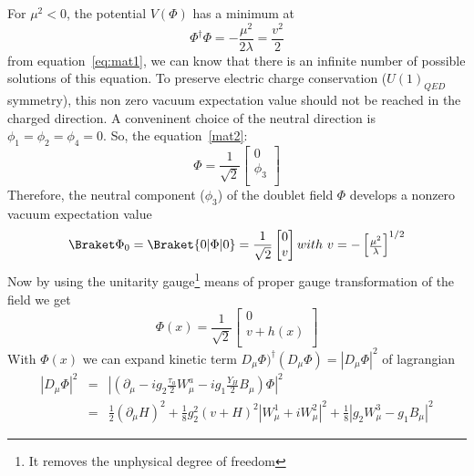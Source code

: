 For $\mu^2<0$, the potential $V(\Phi)$ has a minimum at
\begin{equation}
    \Phi^{\dagger}\Phi = -\frac{\mu^2}{2\lambda}=\frac{v^2}{2}
\end{equation}
from equation~\ref{eq:mat1}, we can know that there is an infinite number of possible solutions of this equation. To preserve electric charge conservation ($U(1)_{QED}$ symmetry), this non zero vacuum expectation value should not be reached in the charged direction. A conveninent choice of the neutral direction is $\phi_1 = \phi_2 = \phi_4 = 0$. So, the equation~\ref{mat2}:
\begin{equation}
    \Phi=\frac{1}{\sqrt{2}}
        \begin{bmatrix}
        0   \\
        \phi_3  \\
        \end{bmatrix}
\end{equation}
Therefore, the neutral component ($\phi_3$) of the doublet field $\Phi$ develops a nonzero vacuum expectation value
\begin{equation}
    {\Braket\Phi}_0 = \Braket{0|\Phi|0}=\frac{1}{\sqrt{2}}
        \begin{bmatrix}
        0   \\
        v   \\
        \end{bmatrix}
        with~
        v=-
        \begin{bmatrix}
        \frac{\mu^2}{\lambda}
        \end{bmatrix}
        ^{1/2}
\end{equation}
Now by using the unitarity gauge\footnote{It removes the unphysical degree of freedom} means of proper gauge transformation of the field we get
\begin{equation}
    \Phi (x)=\frac{1}{\sqrt{2}}
        \begin{bmatrix}
        0   \\
        v+h(x)  \\
        \end{bmatrix}
\end{equation}
With $\Phi(x)$ we can expand kinetic term $D_\mu \Phi)^{\dagger} (D_\mu \Phi)=|D_\mu \Phi|^2$ of lagrangian
\begin{eqnarray}\label{mat3}
    |D_{\mu} \Phi|^2 & = & |(\partial_{\mu}-ig_2\frac{\tau_a}{2}W^a_{\mu}-ig_1 \frac{Y_H}{2}B_{\mu})\Phi|^2 \nonumber \\
            & = & \frac{1}{2}(\partial_\mu H)^2+\frac{1}{8}g^2_2(v+H)^2|W^1_{\mu}+iW^2_\mu|^2+\frac{1}{8}|g_2W^3_\mu-g_1B_\mu|^2
\end{eqnarray}
